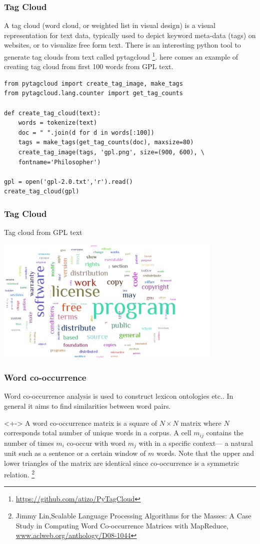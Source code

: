 \documentclass[serif,11pt,aspectratio=1610,table]{beamer}
\begin{document}
\begin{frame}[fragile]
 \frametitle{Tag Cloud}
\small
A tag cloud (word cloud, or weighted list in visual design) is a visual representation for text data, typically used to depict keyword meta-data (tags) on websites, or to visualize free form text.
There is an interesting python tool to generate tag clouds from text called pytagcloud \footnote{\url{https://github.com/atizo/PyTagCloud}}. here comes an example of creating tag cloud from first 100 words from GPL text. 
\footnotesize
\begin{verbatim}
from pytagcloud import create_tag_image, make_tags
from pytagcloud.lang.counter import get_tag_counts

def create_tag_cloud(text):
    words = tokenize(text)
    doc = " ".join(d for d in words[:100])
    tags = make_tags(get_tag_counts(doc), maxsize=80)
    create_tag_image(tags, 'gpl.png', size=(900, 600), \
    fontname='Philosopher')

gpl = open('gpl-2.0.txt','r').read()
create_tag_cloud(gpl)
\end{verbatim}

\end{frame}

\begin{frame}[fragile]
 \frametitle{Tag Cloud}
Tag cloud from GPL text\\
\begin{center}
 \includegraphics[height=6cm]{tc.png}
\end{center}

\end{frame}

\begin{frame}[fragile]
  \frametitle{Word co-occurrence}
Word co-occurrence analysis is used to construct lexicon ontologies etc.. In general it aims to find similarities between word pairs.
\begin{block}<+->{}
A word co-occurrence matrix is a square of $N \times N$ matrix where $N$ corresponds total number of unique words in a corpus. A cell $m_{ij}$ contains the number of times $m_{i}$ co-occur with word $m_{j}$ with in a specific context— a natural unit such as a sentence or a certain window of $m$ words. Note that the upper and lower triangles of the matrix are identical since co-occurrence is a symmetric relation. \footnote{Jimmy Lin,Scalable Language Processing Algorithms for the Masses: A Case Study in Computing Word Co-occurrence Matrices with MapReduce, \url{www.aclweb.org/anthology/D08-1044}}
\end{block}

\end{frame}
\end{document}
